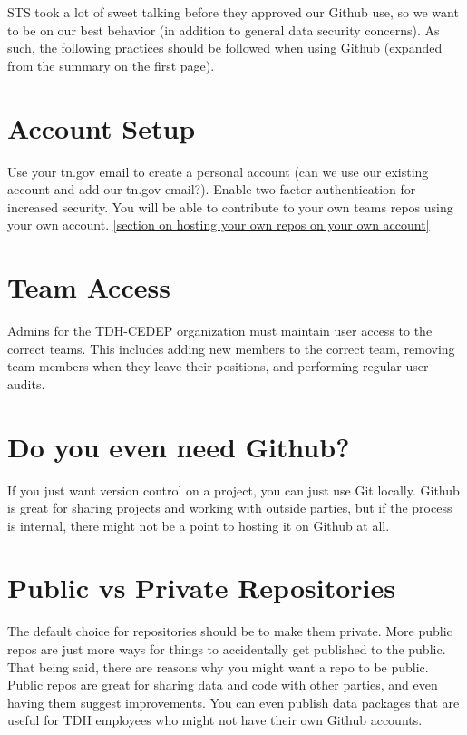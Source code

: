 \documentclass[
  letterpaper,
  DIV=11,
  numbers=noendperiod]{scrreprt}
\begin{document}
STS took a lot of sweet talking before they approved our Github use, so
we want to be on our best behavior (in addition to general data security
concerns). As such, the following practices should be followed when
using Github (expanded from the summary on the first page).

\hypertarget{account-setup}{%
\section{Account Setup}\label{account-setup}}

Use your tn.gov email to create a personal account (can we use our
existing account and add our tn.gov email?). Enable two-factor
authentication for increased security. You will be able to contribute to
your own teams repos using your own account. \ul{{[}section on hosting
your own repos on your own account{]}}

\hypertarget{team-access}{%
\section{Team Access}\label{team-access}}

Admins for the TDH-CEDEP organization must maintain user access to the
correct teams. This includes adding new members to the correct team,
removing team members when they leave their positions, and performing
regular user audits.

\hypertarget{do-you-even-need-github}{%
\section{Do you even need Github?}\label{do-you-even-need-github}}

If you just want version control on a project, you can just use Git
locally. Github is great for sharing projects and working with outside
parties, but if the process is internal, there might not be a point to
hosting it on Github at all.

\hypertarget{public-vs-private-repositories}{%
\section{Public vs Private
Repositories}\label{public-vs-private-repositories}}

The default choice for repositories should be to make them private. More
public repos are just more ways for things to accidentally get published
to the public. That being said, there are reasons why you might want a
repo to be public. Public repos are great for sharing data and code with
other parties, and even having them suggest improvements. You can even
publish data packages that are useful for TDH employees who might not
have their own Github accounts.
\end{document}
